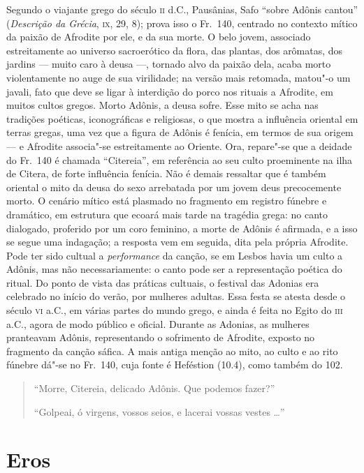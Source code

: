 {\small Segundo o viajante grego do século \textsc{ii} d.C., Pausânias, Safo “sobre
Adônis cantou” (\textit{Descrição da Grécia}, \textsc{ix}, 29, 8); prova isso o Fr.~140, 
centrado no contexto mítico da paixão de Afrodite por ele, e da sua morte.
O belo jovem, associado estreitamente ao universo sacroerótico da
flora, das plantas, dos arômatas, dos jardins --- muito caro à deusa ---,
tornado alvo da paixão dela, acaba morto violentamente no auge de sua
virilidade; na versão mais retomada, matou"-o um javali, fato que deve se ligar
à interdição do porco nos rituais a Afrodite, em muitos cultos gregos. Morto
Adônis, a deusa sofre. Esse mito se acha nas tradições poéticas, iconográficas
e religiosas, o que mostra a influência oriental em terras gregas, uma vez que
a figura de Adônis é fenícia, em termos de sua origem --- e Afrodite associa"-se
estreitamente ao Oriente. Ora, repare"-se que a deidade do Fr.~140 é chamada
``Citereia”, em referência ao seu culto proeminente na ilha de Citera,
de forte influência fenícia. Não é demais ressaltar que é também oriental o
mito da deusa do sexo arrebatada por um jovem deus precocemente morto. O
cenário mítico está plasmado no fragmento em registro fúnebre e dramático, em
estrutura que ecoará mais tarde na tragédia grega: no canto dialogado,
proferido por um coro feminino, a morte de Adônis é afirmada, e a isso
se segue uma indagação; a resposta vem em seguida, dita pela própria Afrodite.
Pode ter sido cultual a \textit{performance} da canção, se em Lesbos havia um
culto a Adônis, mas não necessariamente: o canto pode ser a representação
poética do ritual. Do ponto de vista das práticas cultuais, o festival das Adonias 
era celebrado no início do verão, por mulheres adultas. Essa festa se atesta 
desde o século \textsc{vi} a.C., em várias partes do
mundo grego, e ainda é feita no Egito do \textsc{iii} a.C., agora de modo público e
oficial. Durante as Adonias, as mulheres pranteavam Adônis, representando o
sofrimento de Afrodite, exposto no fragmento da canção sáfica. A mais antiga
menção ao mito, ao culto e ao rito fúnebre dá"-se no Fr.~140, cuja fonte é
Heféstion (10.4), como também do 102.}

\begin{verse}
“Morre, Citereia, delicado Adônis. Que \qb{}podemos fazer?”

“Golpeai, ó virgens, vossos seios, e lacerai \qb{}vossas vestes \ldots{}”
\end{verse}

\oneside

\chapter{Eros}

